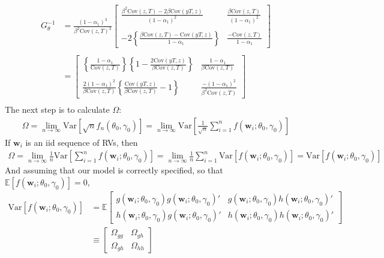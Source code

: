 \documentclass[12pt]{article}
\begin{document}
\begin{align*}
  G_\theta^{-1} &= \frac{(1 - \alpha_1)^3}{\beta^2 \mbox{Cov}(z,T)^2} 
  \left[
  \begin{array}{cc}
    \displaystyle \frac{ \beta^2\mbox{Cov}(z,T) - 2\beta \mbox{Cov}(yT,z)}{(1 - \alpha_1)^2}  & \displaystyle  \frac{\beta \mbox{Cov}(z,T)}{(1 - \alpha_1)^2} \\ \\
    \displaystyle -2\left\{ \frac{\beta\mbox{Cov}(z,T) - \mbox{Cov}(yT,z) }{1 - \alpha_1} \right\} & \displaystyle\frac{-\mbox{Cov}(z,T)}{1 - \alpha_1}
  \end{array}
\right] \\ \\
  &=\left[
  \begin{array}{cc}
    \displaystyle \left\{\frac{1 - \alpha_1}{\mbox{Cov}(z,T)}\right\}\left\{ 1 - \frac{2\mbox{Cov}(yT,z)}{\beta\mbox{Cov}(z,T)} \right\}& \displaystyle  \frac{1 - \alpha_1}{\beta \mbox{Cov}(z,T)} \\ \\
    \displaystyle \frac{2(1 - \alpha_1)^2}{\beta \mbox{Cov}(z,T)}\left\{ \frac{\mbox{Cov}(yT,z)}{\beta\mbox{Cov}(z,T)} - 1 \right\} & \displaystyle \frac{-(1 - \alpha_1)^2}{\beta^2 \mbox{Cov}(z,T)} 
  \end{array}
\right] \\
\end{align*}
The next step is to calculate $\Omega$:
\begin{align*}
  \Omega = \lim_{n\rightarrow \infty}\mbox{Var}\left[\sqrt{n}f_n(\theta_0, \gamma_0)\right] 
  = \lim_{n\rightarrow \infty}\mbox{Var}\left[\frac{1}{\sqrt{n}} \sum_{i=1}^n f(\mathbf{w}_i; \theta_0, \gamma_0)  \right]
\end{align*}
If $\mathbf{w}_i$ is an iid sequence of RVs, then
\begin{align*}
  \Omega = \lim_{n\rightarrow \infty}\frac{1}{n}\mbox{Var}\left[ \sum_{i=1}^n f(\mathbf{w}_i; \theta_0, \gamma_0)\right] = \lim_{n\rightarrow \infty} \frac{1}{n}\sum_{i=1}^n \mbox{Var}\left[ f(\mathbf{w}_i;\theta_0, \gamma_0) \right] = \mbox{Var}\left[ f(\mathbf{w}_i;\theta_0, \gamma_0) \right]  
\end{align*}
And assuming that our model is correctly specified, so that $\mathbb{E}\left[ f(\mathbf{w}_i;\theta_0, \gamma_0) \right]=0$,
\begin{align*}
  \mbox{Var}\left[ f(\mathbf{w}_i; \theta_0, \gamma_0) \right] 
  &=\mathbb{E}
  \left[
  \begin{array}{cc}
    g(\mathbf{w}_i;\theta_0, \gamma_0)g(\mathbf{w}_i;\theta_0, \gamma_0)' &
    g(\mathbf{w}_i;\theta_0, \gamma_0)h(\mathbf{w}_i;\theta_0, \gamma_0)' \\
    h(\mathbf{w}_i;\theta_0, \gamma_0)g(\mathbf{w}_i;\theta_0, \gamma_0)' &
    h(\mathbf{w}_i;\theta_0, \gamma_0)h(\mathbf{w}_i;\theta_0, \gamma_0)'
  \end{array}
\right]\\ &\equiv
\left[
\begin{array}{cc}
  \Omega_{gg} & \Omega_{gh}\\
  \Omega_{gh} & \Omega_{hh}
\end{array}
\right]
\end{align*}
\end{document}
